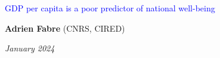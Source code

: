 \documentclass[aspectratio=169,xcolor=dvipsnames, 11pt,mathserif]{beamer}
\begin{document}
\begin{frame}
\thispagestyle{empty}
\begin{center}
\begin{LARGE}
\textcolor{blue}{GDP per capita is a poor predictor of national well-being}
\end{LARGE}

\vspace{1cm}
\textbf{Adrien Fabre} (CNRS, CIRED)

\medskip
{}
\textit{January 2024} 

\end{center}

\bigskip

\end{frame}




\end{document}
